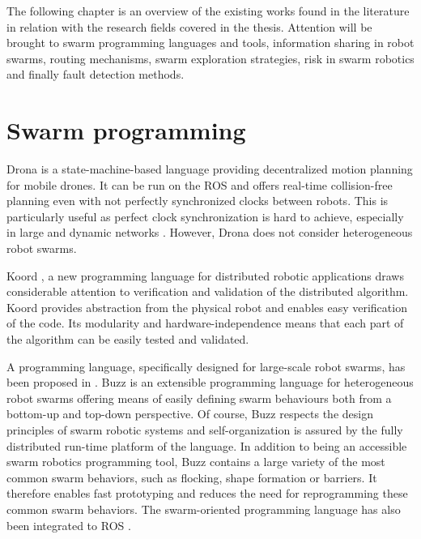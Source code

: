 \label{sec:RevLitt}
The following chapter is an overview of the existing works found in the literature in relation with the research fields covered in the thesis. Attention will be brought to swarm programming languages and tools, information sharing in robot swarms, routing mechanisms, swarm exploration strategies, risk in swarm robotics and finally fault detection methods. 

\section{Swarm programming}
Drona \cite{desai2017drona} is a state-machine-based language providing decentralized motion planning for mobile drones. It can be run on the \ac{ROS} \cite{quigley2009ros} and offers real-time collision-free planning even with not perfectly synchronized clocks between robots. This is particularly useful as perfect clock synchronization is hard to achieve, especially in large and dynamic networks \cite{cao2021distributed}. However, Drona does not consider heterogeneous robot swarms.

Koord \cite{ghosh2020koord}, a new programming language for distributed robotic applications draws considerable attention to verification and validation of the distributed algorithm. Koord provides abstraction from the physical robot and enables easy verification of the code. Its modularity and hardware-independence means that each part of the algorithm can be easily tested and validated.

A programming language, specifically designed for large-scale robot swarms, has been proposed in \cite{pinciroliBuzz2016}. Buzz is an extensible programming language for heterogeneous robot swarms offering means of easily defining swarm behaviours both from a bottom-up and top-down perspective. Of course, Buzz respects the design principles of swarm robotic systems and self-organization is assured by the fully distributed run-time platform of the language. In addition to being an accessible swarm robotics programming tool, Buzz contains a large variety of the most common swarm behaviors, such as flocking, shape formation or barriers. It therefore enables fast prototyping and reduces the need for reprogramming these common swarm behaviors. The swarm-oriented programming language has also been integrated to \ac{ROS} \cite{st2017ros}.

